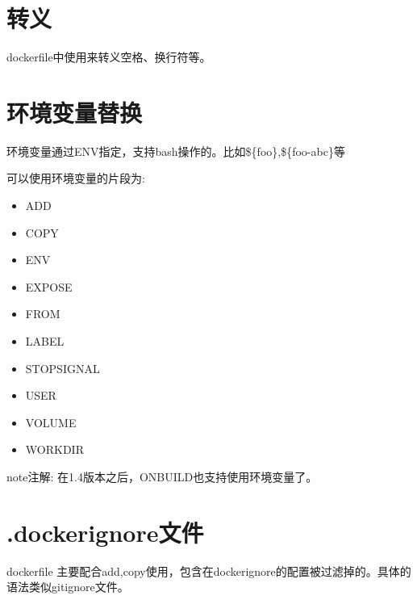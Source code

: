 \documentclass[letterpaper,10pt,english]{sphinxmanual}
\begin{document}
%
\begin{sphinxVerbatim}[commandchars=\\\{\}]
\end{sphinxVerbatim}


\section{转义}
\label{\detokenize{_u8fd0_u884c_u5e94_u7528/05-dockerfile_u53c2_u8003:id3}}
dockerfile中使用来转义空格、换行符等。


\section{环境变量替换}
\label{\detokenize{_u8fd0_u884c_u5e94_u7528/05-dockerfile_u53c2_u8003:id4}}
环境变量通过ENV指定，支持bash操作的。比如\$\{foo\},\$\{foo-abc\}等

可以使用环境变量的片段为:
\begin{itemize}
\item {} 
ADD

\item {} 
COPY

\item {} 
ENV

\item {} 
EXPOSE

\item {} 
FROM

\item {} 
LABEL

\item {} 
STOPSIGNAL

\item {} 
USER

\item {} 
VOLUME

\item {} 
WORKDIR

\end{itemize}

\begin{sphinxadmonition}{note}{注解:}
在1.4版本之后，ONBUILD也支持使用环境变量了。
\end{sphinxadmonition}


\section{.dockerignore文件}
\label{\detokenize{_u8fd0_u884c_u5e94_u7528/05-dockerfile_u53c2_u8003:dockerignore}}
dockerfile 主要配合add,copy使用，包含在dockerignore的配置被过滤掉的。具体的语法类似gitignore文件。
\end{document}
